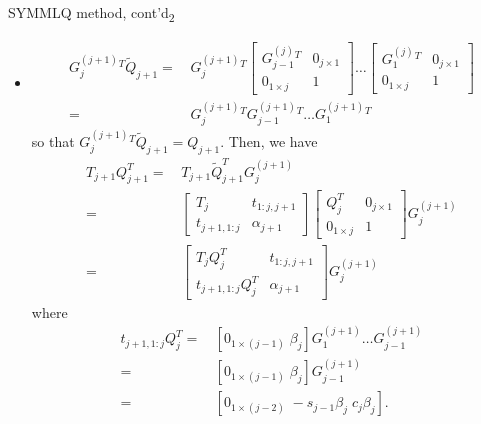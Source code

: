 \documentclass[t,usepdftitle=false]{beamer}
\begin{document}
\begin{frame}{SYMMLQ method, cont'd\textsubscript{2}}
\begin{itemize}
\item[]\vspace{-.5cm}
\begin{align*}
G_j^{(j+1)}{}^T\tilde{Q}_{j+1}=&\,
G_j^{(j+1)}{}^T
\begin{bmatrix}
G_{j-1}^{(j)}{}^T&0_{j\times 1}\\
0_{1\times j}&1
\end{bmatrix}
\dots
\begin{bmatrix}
G_{1}^{(j)}{}^T&0_{j\times 1}\\
0_{1\times j}&1
\end{bmatrix}\\
=&\,
G_j^{(j+1)}{}^T
G_{j-1}^{(j+1)}{}^T
\dots
G_1^{(j+1)}{}^T
\end{align*}
so that $G_j^{(j+1)}{}^T\tilde{Q}_{j+1}=Q_{j+1}$.
Then, we have
\begin{align*}
T_{j+1}Q_{j+1}^T
=&\,
T_{j+1}\tilde{Q}_{j+1}^TG_j^{(j+1)}\\
=&\,
\begin{bmatrix}T_j&t_{1:j,j+1}\\t_{j+1,1:j}&\alpha_{j+1}\end{bmatrix}
\begin{bmatrix}Q_j^T&0_{j\times 1}\\0_{1\times j}&1\end{bmatrix}
G_j^{(j+1)}\\
=&\,
\begin{bmatrix}T_jQ_j^T&t_{1:j,j+1}\\t_{j+1,1:j}Q_j^T&\alpha_{j+1}\end{bmatrix}
G_j^{(j+1)}
\end{align*}
where\vspace{-.4cm}
\begin{align*}
t_{j+1,1:j}Q_j^T
=&\,[0_{1\times(j-1)}\;\beta_j]G_1^{(j+1)}\dots G_{j-1}^{(j+1)}\\
=&\,[0_{1\times(j-1)}\;\beta_j]G_{j-1}^{(j+1)}\\
=&\,[0_{1\times (j-2)}\;-\!s_{j-1}\beta_j\;c_j\beta_j].
\end{align*}
\end{itemize}
\end{frame}
\end{document}
